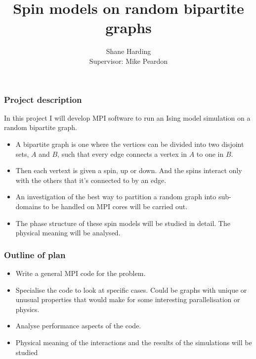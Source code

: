 \documentclass[pdf]{beamer}
\title{Spin models on random bipartite graphs}
\author{Shane Harding \\ Supervisor: Mike Peardon}
\begin{document}
\begin{frame}
\titlepage
\end{frame}

\begin{frame}
\frametitle{Project description}
In this project I will develop MPI software to run an Ising model simulation on a random bipartite graph.
\begin{itemize}
\item A bipartite graph is one where the vertices can be divided into two disjoint sets, $A$ and $B$, such that every edge connects a vertex in $A$ to one in $B$.
\item Then each vertext is given a spin, up or down. And the spins interact only with the others that it's connected to by an edge.
\item An investigation of the best way to partition a random graph into sub-domains to be handled on MPI cores will be carried out. 
\item The phase structure of these spin models will be studied in detail. The physical meaning will be analysed.
\end{itemize}
\end{frame}


\begin{frame}
\frametitle{Outline of plan}
\begin{itemize}
\item Write a general MPI code for the problem.
\item Specialise the code to look at specific cases. Could be graphs with unique or unusual properties that would make for some interesting parallelisation or physics.
\item Analyse performance aspects of the code.
\item Physical meaning of the interactions and the results of the simulations will be studied
\end{itemize}
\end{frame}
\end{document}
